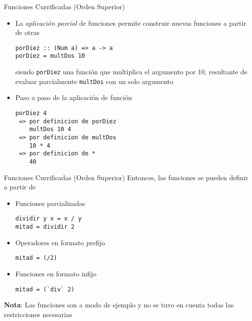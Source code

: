 \begin{frame}[fragile]{Funciones Currificadas (Orden Superior)}
    \begin{itemize}
        \item La \emph{aplicación parcial} de funciones permite construir nuevas funciones a partir de otras
        \begin{lstlisting}[style=consola]
porDiez :: (Num a) => a -> a
porDiez = multDos 10
        \end{lstlisting}
        siendo \verb|porDiez| una función que multiplica el argumento por 10, resultante de evaluar parcialmente \verb|multDos| con un solo argumento
        \item Paso a paso de la aplicación de función
        \begin{lstlisting}[style=consola]
    porDiez 4
 => por definicion de porDiez
    multDos 10 4
 => por definicion de multDos
    10 * 4
 => por definicion de *
    40
        \end{lstlisting}
    \end{itemize}
\end{frame}

\begin{frame}[fragile]{Funciones Currificadas (Orden Superior)}
    Entonces, las funciones se pueden definir a partir de 
    \begin{itemize}
        \item Funciones parcializadas
        \begin{lstlisting}[style=consola]
dividir y x = x / y
mitad = dividir 2
        \end{lstlisting}
        \item Operadores en formato prefijo
        \begin{lstlisting}[style=consola]
mitad = (/2)
        \end{lstlisting}
        \item Funciones en formato infijo
        \begin{lstlisting}[style=consola]
mitad = (`div` 2)
        \end{lstlisting}
    \end{itemize}
    \textbf{Nota}: Las funciones son a modo de ejemplo y no se tuvo en cuenta todas las restricciones necesarias
\end{frame}

